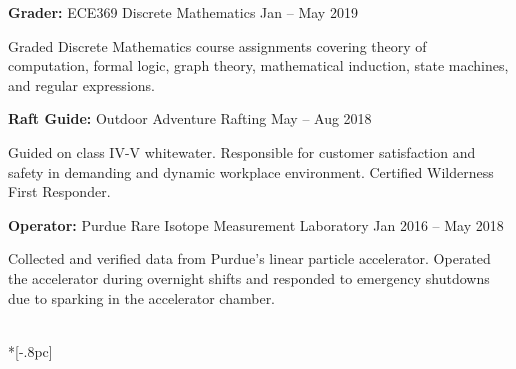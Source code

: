 \documentclass{article}
\begin{document}
\textbf{Grader:} ECE369 Discrete Mathematics \hfill Jan -- May 2019\\
\vspace{-12pt}
\begin{adjustwidth}{20pt}{}
Graded Discrete Mathematics course assignments covering theory of computation, formal logic, graph theory, mathematical induction, state machines, and regular expressions.
\end{adjustwidth}

\textbf{Raft Guide:} Outdoor Adventure Rafting \hfill May -- Aug 2018\\
\vspace{-12pt}
\begin{adjustwidth}{20pt}{}
Guided on class IV-V whitewater. Responsible for customer satisfaction and safety in demanding and dynamic workplace environment. Certified Wilderness First Responder.\\
\end{adjustwidth}
\vspace{-12pt}

\textbf{Operator:} Purdue Rare Isotope Measurement Laboratory \hfill Jan 2016 -- May 2018\\
\vspace{-12pt}
\begin{adjustwidth}{20pt}{}
Collected and verified data from Purdue's linear particle accelerator. Operated the accelerator during overnight shifts and responded to emergency shutdowns due to sparking in the accelerator chamber.\\
\end{adjustwidth}
\vspace{-12pt}



\vspace{5pt}{\large \bf Leadership} \\*[-.8pc]
\underline{\hspace{6in}}
\end{document}
